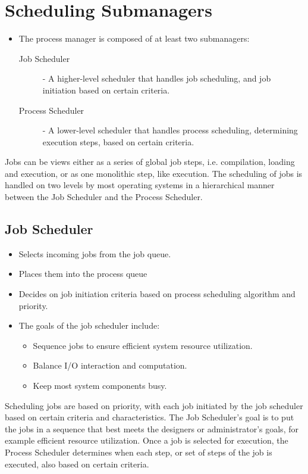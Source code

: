 \documentclass[12pt letter]{report}
\begin{document}
\section{Scheduling Submanagers}
\begin{itemize}
  \item The process manager is composed of at least two submanagers:
    \begin{description}
      \item[Job Scheduler] - A higher-level scheduler that handles
        job scheduling, and job initiation based on certain criteria.
      \item[Process Scheduler] - A lower-level scheduler that handles
        process scheduling, determining execution steps, based on
        certain criteria.
    \end{description}
\end{itemize}

Jobs can be views either as a series of global job steps, i.e.
compilation, loading and execution, or as one monolithic step, like
execution. The scheduling of jobs is handled on two levels by most
operating systems in a hierarchical manner between the Job Scheduler
and the Process Scheduler.

\subsection{Job Scheduler}
\begin{itemize}
  \item Selects incoming jobs from the job queue.
  \item Places them into the process queue
  \item Decides on job initiation criteria based on process
    scheduling algorithm and priority.
  \item The goals of the job scheduler include:
    \begin{itemize}
      \item Sequence jobs to ensure efficient system resource utilization.
      \item Balance I/O interaction and computation.
      \item Keep most system components busy.
    \end{itemize}
\end{itemize}

Scheduling jobs are based on priority, with each job initiated by the
job scheduler based on certain criteria and characteristics. The Job
Scheduler's goal is to put the jobs in a sequence that best meets the
designers or administrator's goals, for example efficient resource
utilization. Once a job is selected for execution, the Process
Scheduler determines when each step, or set of steps of the job is
executed, also based on certain criteria.
\end{document}
